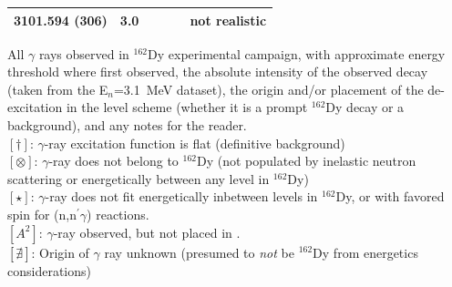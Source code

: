 \begin{landscape}
\begin{center}
\begin{longtable}{p{2.6cm}|p{1.2cm}|r|p{1.1cm}|p{2.0cm}|l}
  3101.594 (306) & 3.0        && & & not realistic \\\hline \hline 
\end{longtable}
\end{center}
All $\gamma$ rays observed in $^{162}$Dy experimental campaign, with approximate energy threshold where first observed, the absolute intensity of the observed decay (taken from the E$_n$=3.1~MeV dataset), the origin and/or placement of the de-excitation in the level scheme (whether it is a prompt $^{162}$Dy decay or a background), and any notes for the reader.\\
$[\dagger]$: $\gamma$-ray excitation function is flat (definitive background)\\
$[\otimes]$: $\gamma$-ray does not belong to $^{162}$Dy (not populated by inelastic neutron scattering or energetically between any level in $^{162}$Dy)\\
$[\star]$: $\gamma$-ray does not fit energetically inbetween levels in $^{162}$Dy, or with favored spin for (n,n$^\prime\gamma$) reactions.\\
$[A^2]$: $\gamma$-ray observed, but not placed in \cite{Aprahamian200642}.\\
$[\nexists]$: Origin of $\gamma$ ray unknown (presumed to \textit{not} be $^{162}$Dy from energetics considerations)\\
\end{landscape}